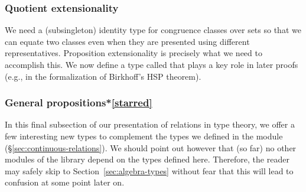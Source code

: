 \subsubsection{Quotient extensionality}\label{quotient-extensionality}

We need a (subsingleton) identity type for congruence classes over sets so that
we can equate two classes even when they are presented using different
representatives. Proposition extensionality is precisely what we need to
accomplish this. We now define a type called  that plays a key
role in later proofs (e.g., in the formalization of Birkhoff's HSP theorem).
\ccpad
\begin{code}%
\end{code}



\subsubsection{General propositions*\protect\cref{starred}}\label{sec:general-props}
In this final subsection of our presentation of relations in type theory, we offer a few interesting new types to complement the types we defined in the module  (\S\ref{sec:continuous-relations}).  We should point out however that (so far) no other modules of the library depend on the types defined here. Therefore, the reader may safely skip to Section~\ref{sec:algebra-types} without fear that this will lead to confusion at some point later on.

